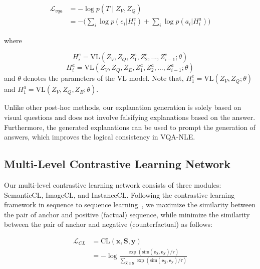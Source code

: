 \documentclass[letterpaper]{article} %
\begin{document}
\begin{equation}\label{COT_loss}
	\begin{split}
		\mathcal{L}_{vqa}&=- \log p \left({T} \mid Z_V,Z_Q \right)\\
		&= - \Big(\sum\nolimits_i \log p(e_{i} | H^e_i) + \sum\nolimits_i \log p(a_{i} | H^a_i) \Big)
	\end{split}
\end{equation} 

where 

\begin{equation*}\label{hidden_e}
	H^e_i= \text{VL}(Z_V,Z_Q,Z^e_1,Z^e_2,...,Z^e_{i-1};\theta)
\end{equation*} 
\begin{equation*}\label{hidden_a}
	H^a_i= \text{VL}(Z_V,Z_Q,Z_E,Z^a_1,Z^a_2,...,Z^a_{i-1};\theta)
\end{equation*} 
and $\theta$ denotes the parameters of the VL model. Note that, $H^e_1=\text{VL}(Z_V,Z_Q;\theta)$  and $H^a_1=\text{VL}(Z_V,Z_Q,Z_E;\theta)$.

Unlike other post-hoc methods, our explanation generation is solely based on visual questions and does not involve falsifying explanations based on the answer. Furthermore, the generated explanations can be used to prompt the generation of answers, which improves the logical consistency in VQA-NLE.

\subsection{Multi-Level Contrastive Learning Network}
Our multi-level contrastive learning network consists of three modules: SemanticCL, ImageCL, and InstanceCL. Following the contrastive learning framework in sequence to sequence learning~\cite{lee2020contrastive}, we maximize the similarity between the pair of anchor and positive (factual) sequence, while minimize the similarity between the pair of anchor and negative (counterfactual) as follows:

\begin{equation}
	\begin{split}
		\mathcal{L}_{CL}&=\text{CL}(\mathbf{x},\mathbf{S},\mathbf{y})\\
		&=- \log \frac{\exp \left(\text{sim}\left(\mathbf{e_x}, \mathbf{e_y}\right) / \tau\right)}{\sum_{\mathbf{\hat{x}}\in \mathbf{S}} \exp \left( \text{sim}\left(\mathbf{e_{\hat{x}}}, \mathbf{e_y}  \right) / \tau\right)}
	\end{split}
\end{equation}
\end{document}
